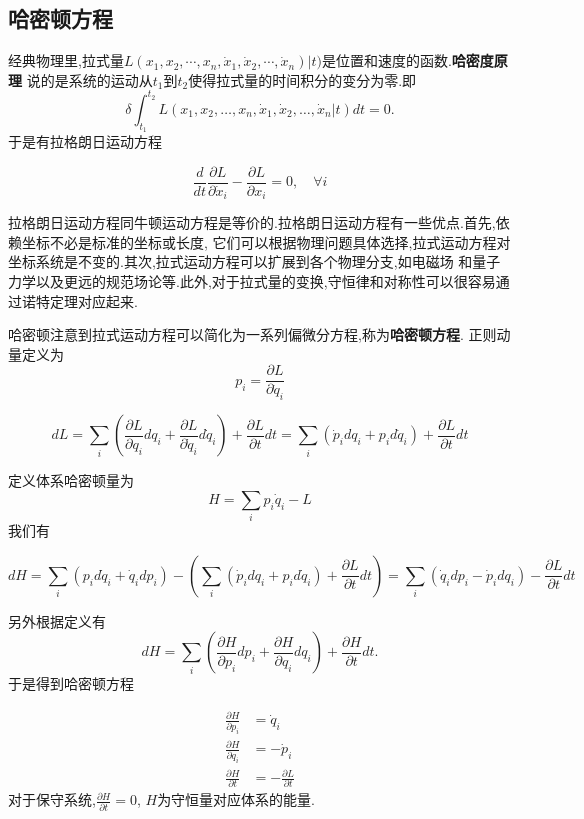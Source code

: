 \subsection{哈密顿方程}
经典物理里,拉式量$L(x_1, x_2, \cdots, x_n, \dot{x}_1, \dot{x}_2, \cdots, \dot{x}_n)|t)$是位置和速度的函数.\textbf{哈密度原理}
说的是系统的运动从$t_1$到$t_2$使得拉式量的时间积分的变分为零.即
\begin{equation}
    \delta \int_{t_1}^{t_2} L\left(x_1, x_2, \ldots, x_n, \dot{x}_1, \dot{x}_2, \ldots, \dot{x}_n | t\right) d t=0 .
\end{equation}
于是有拉格朗日运动方程

\begin{equation}
    \frac{d}{d t} \frac{\partial L}{\partial \dot{x}_i}-\frac{\partial L}{\partial x_i}=0, \quad \forall i
\end{equation}

拉格朗日运动方程同牛顿运动方程是等价的.拉格朗日运动方程有一些优点.首先,依赖坐标不必是标准的坐标或长度,
它们可以根据物理问题具体选择,拉式运动方程对坐标系统是不变的.其次,拉式运动方程可以扩展到各个物理分支,如电磁场
和量子力学以及更远的规范场论等.此外,对于拉式量的变换,守恒律和对称性可以很容易通过诺特定理对应起来.


哈密顿注意到拉式运动方程可以简化为一系列偏微分方程,称为\textbf{哈密顿方程}.
正则动量定义为
\begin{equation}
    p_i=\frac{\partial L}{\partial \dot{q}_i}
\end{equation}

\begin{equation}
    d L=\sum_i\left(\frac{\partial L}{\partial q_i} d q_i+\frac{\partial L}{\partial \dot{q}_i} d \dot{q}_i\right)+\frac{\partial L}{\partial t} d t=\sum_i\left(\dot{p}_i d q_i+p_i d \dot{q}_i\right)+\frac{\partial L}{\partial t} d t
\end{equation}

定义体系哈密顿量为
\begin{equation}
    H=\sum_i p_i \dot{q}_i-L
\end{equation}
我们有

\begin{equation}
    d H=\sum_i\left(p_i d \dot{q}_i+\dot{q}_i d p_i\right)-\left(\sum_i\left(\dot{p}_i d q_i+p_i d \dot{q}_i\right)+\frac{\partial L}{\partial t} d t\right)=\sum_i\left(\dot{q}_i d p_i-\dot{p}_i d q_i\right)-\frac{\partial L}{\partial t} d t
\end{equation}

另外根据定义有
\begin{equation}
    d H=\sum_i\left(\frac{\partial H}{\partial p_i} d p_i+\frac{\partial H}{\partial q_i} d q_i\right)+\frac{\partial H}{\partial t} d t .
\end{equation}
于是得到哈密顿方程

\begin{align}
    \frac{\partial H}{\partial p_i}&=\dot{q}_i
    \\
    \frac{\partial H}{\partial q_i}&=-\dot{p}_i
    \\
    \frac{\partial H}{\partial t}&=-\frac{\partial L}{\partial t}
\end{align}
对于保守系统,$\frac{\partial H}{\partial t}=0$, $H$为守恒量对应体系的能量.